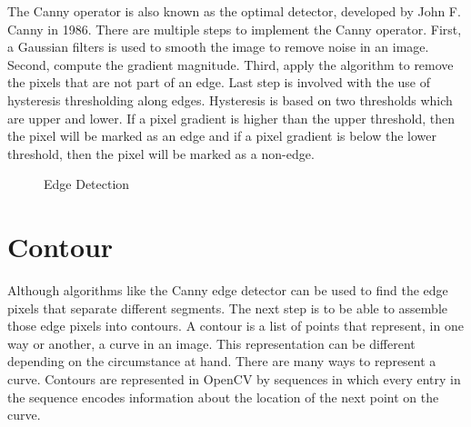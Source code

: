 The Canny operator is also known as the optimal detector, developed by John F. Canny in 1986.  There are multiple steps to implement the Canny operator. First, a Gaussian filters is used to smooth the image to remove noise in an image. Second, compute the gradient magnitude. Third, apply the algorithm to remove the pixels that are not part of an edge. Last step is involved with the use of hysteresis thresholding along edges. Hysteresis is based on two thresholds which are upper and lower. If a pixel gradient is higher than the upper threshold, then the pixel will be marked as an edge and if a pixel gradient is below the lower threshold, then the pixel will be marked as a non-edge. \cite{CannyEdgeDetection}

\begin{figure}[H]
\centering
{}
\caption {Edge Detection}
\label {fig:EdgeDetection}
\end{figure}

\section{Contour}
Although algorithms like the Canny edge detector can be used to find the edge pixels that separate different segments. The next step is to be able to assemble those edge pixels into contours.
A contour is a list of points that represent, in one way or another, a curve in an image. This representation can be different depending on the circumstance at hand. There are many ways to represent a curve. Contours are represented in OpenCV by sequences in which every entry in the sequence encodes information about the location of the next point on the curve.

